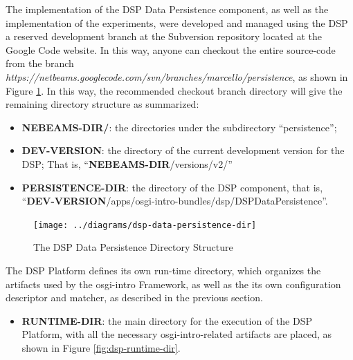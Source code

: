 The implementation of the DSP Data Persistence component, as well as the
implementation of the experiments, were developed and managed using the DSP a
reserved development branch at the Subversion \cite{subversion} repository
located at the Google Code website. In this way, anyone can checkout the entire
source-code from the branch
\textit{https://netbeams.googlecode.com/svn/branches/marcello/persistence},
as shown in Figure \ref{fig:dsp-data-persistence-dir}. In this way, the
recommended checkout branch directory will give the remaining directory
structure as summarized:

\begin{itemize}
  \item \textbf{NEBEAMS-DIR/}: the directories under the subdirectory
  ``persistence'';
  \item \textbf{DEV-VERSION}: the directory of the current development
  version for the DSP; That is, ``\textbf{NEBEAMS-DIR}/versions/v2/''
  \item \textbf{PERSISTENCE-DIR}: the directory of the DSP component, that is,
  ``\textbf{DEV-VERSION}/apps/osgi-intro-bundles/dsp/DSPDataPersistence''.
\end{itemize}

\begin{figure}[!b]
  \centering
  \texttt{[image: ../diagrams/dsp-data-persistence-dir]}
  \caption{The DSP Data Persistence Directory Structure}
  \label{fig:dsp-data-persistence-dir}
\end{figure}

The DSP Platform defines its own run-time directory, which organizes the
artifacts used by the osgi-intro Framework, as well as the its own configuration
descriptor and matcher, as described in the previous section. 

\begin{itemize}
  \item \textbf{RUNTIME-DIR}: the main directory for the execution of the DSP
Platform, with all the necessary osgi-intro-related artifacts are placed, as shown in
Figure \ref{fig:dsp-runtime-dir}.
\end{itemize}

